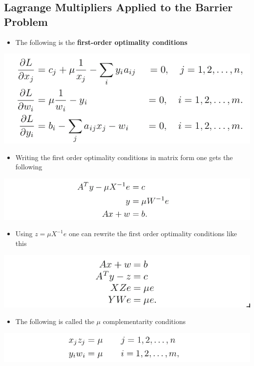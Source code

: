 \documentclass[11pt]{article}
\begin{document}
\subsection{Lagrange Multipliers Applied to the Barrier Problem}
\label{sec:orgf9f7cbb}
\begin{itemize}
\item The following is the \textbf{first-order optimality conditions}
\end{itemize}
\begin{center}
\includegraphics[width=.9\linewidth]{The Central Path/screenshot_2019-03-11_15-43-29.png}
\end{center} 
\begin{itemize}
\item Writing the first order optimality conditions in matrix form one gets the following
\end{itemize}
\begin{center}
\includegraphics[width=.9\linewidth]{The Central Path/screenshot_2019-03-11_15-44-29.png}
\end{center}
\begin{itemize}
\item Using \(z= \mu X^{-1}e\) one can rewrite the first order optimality conditions like this
\end{itemize}
\begin{center}
\includegraphics[width=.9\linewidth]{The Central Path/screenshot_2019-03-11_15-50-41.png}
\end{center}
\begin{itemize}
\item The following is called the \(\mu\) complementarity conditions
\end{itemize}
\begin{center}
\includegraphics[width=.9\linewidth]{The Central Path/screenshot_2019-03-11_15-47-08.png}
\end{center}
\end{document}
